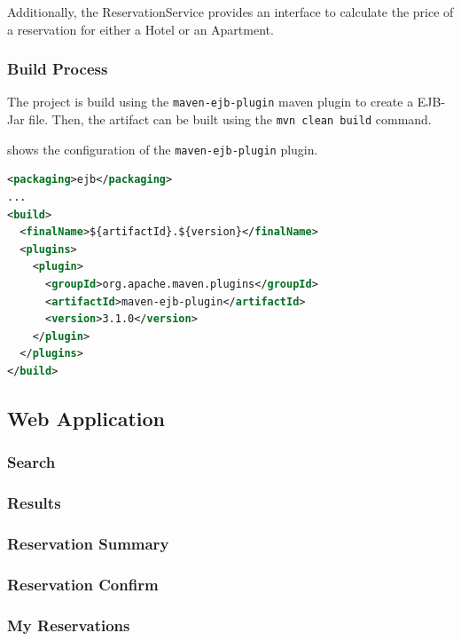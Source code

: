 Additionally, the ReservationService provides an interface to calculate the price of a reservation for either a Hotel or an Apartment.


\subsubsection{Build Process}
The project is build using the \texttt{maven-ejb-plugin} maven plugin to create a EJB-Jar file.
Then, the artifact can be built using the \texttt{mvn clean build} command.

 shows the configuration of the \texttt{maven-ejb-plugin} plugin.
\begin{lstlisting}[label=lst:02_impl_ejb_buildprocess_pluginconfig, caption=\texttt{maven-ejb-plugin} plugin configuration, language=xml]
<packaging>ejb</packaging>
...
<build>
  <finalName>${artifactId}.${version}</finalName>
  <plugins>
    <plugin>
      <groupId>org.apache.maven.plugins</groupId>
      <artifactId>maven-ejb-plugin</artifactId>
      <version>3.1.0</version>
    </plugin>
  </plugins>
</build>
\end{lstlisting}



\subsection{Web Application}

\subsubsection{Search}

\subsubsection{Results}

\subsubsection{Reservation Summary}

\subsubsection{Reservation Confirm}

\subsubsection{My Reservations}
